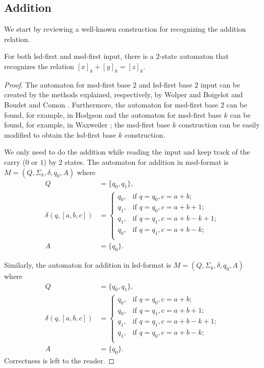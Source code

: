 \documentclass[12pt,reqno]{article}
\begin{document}
\subsection{Addition}

We start by reviewing a well-known construction for recognizing the addition relation.
\begin{theorem} \label{theorem:addition-FA}
For both lsd-first and msd-first input, there is a $2$-state automaton that recognizes the relation
$[x]_k + [y]_k = [z]_k$.
\end{theorem}

\begin{proof}
    The automaton for msd-first base $2$ and lsd-first base $2$ input can be created by the methods explained, respectively, by Wolper and Boigelot \cite{wolper_construction_2000} and Boudet and Comon \cite{boudet_diophantine_1996}. Furthermore, the automaton for msd-first base $2$ can be found, for example, in Hodgson \cite{hodgson_decidabilite_1983} and the automaton for msd-first base $k$ can be found, for example, in Waxweiler \cite[Proposition 4.4.2]{waxweiler_caractere_2009}; the msd-first base $k$ construction can be easily modified to obtain the lsd-first base $k$ construction.
    
    We only need to do the addition while reading the input and keep track of the carry ($0$ or $1$) by $2$ states.
    The automaton for addition in msd-format is $M=(Q, \Sigma_k, \delta, q_0, A)$ where 
\begin{align*}
        Q &= \{q_0, q_1\} ,\\
        \delta(q, [a, b, c]) &=
                \begin{cases}
                q_0, &  \text{if $q=q_0, c=a+b$}; \\
                q_1, &  \text{if $q=q_0, c=a+b+1$}; \\
                q_1, &  \text{if $q=q_1, c=a+b-k+1$}; \\
                q_0, &  \text{if $q=q_1, c=a+b-k$}; \\
            \end{cases} \\
        A &= \{ q_0\}.
    \end{align*}

    Similarly, the automaton for addition in lsd-format is $M=(Q, \Sigma_k, \delta, q_0, A)$ where 
    \begin{align*}
        Q &= \{q_0, q_1\}, \\
        \delta(q, [a, b, c]) &=
                    \begin{cases}
                q_0, &  \text{if $q=q_0, c=a+b$}; \\
                q_0, &  \text{if $q=q_1, c=a+b+1$}; \\
                q_1, &  \text{if $q=q_1, c=a+b-k+1$}; \\
                q_1, &  \text{if $q=q_0, c=a+b-k$}; \\
            \end{cases} \\
        A &= \{ q_0\}.
    \end{align*}
Correctness is left to the reader.
\end{proof}
\end{document}
